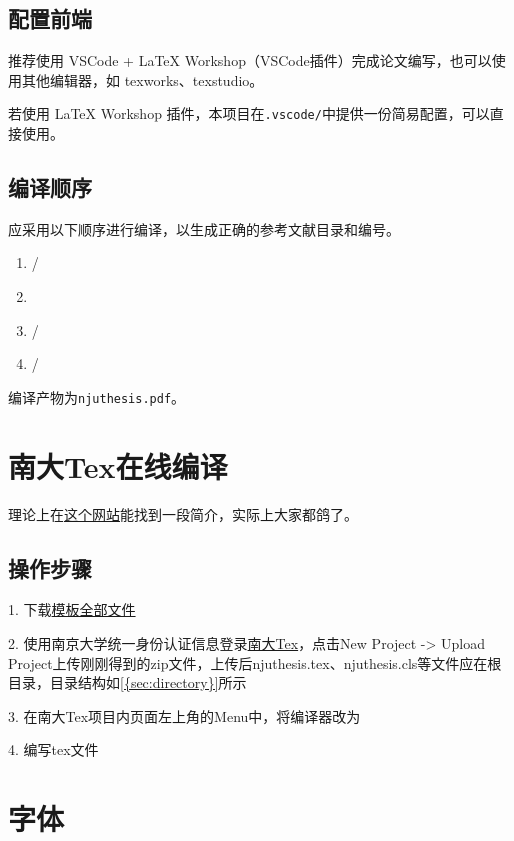 \subsection{配置前端}

推荐使用 VSCode + LaTeX Workshop（VSCode插件）完成论文编写，也可以使用其他编辑器，如 texworks、texstudio。

若使用 LaTeX Workshop 插件，本项目在\lstinline|.vscode/|中提供一份简易配置，可以直接使用。

\subsection{编译顺序}
应采用以下顺序进行编译，以生成正确的参考文献目录和编号。
\begin{enumerate}
    \item {}/
    \item {}
    \item {}/
    \item {}/
\end{enumerate}

编译产物为\lstinline|njuthesis.pdf|。

\section{南大Tex在线编译}

理论上在\href{https://doc.nju.edu.cn/books/latex}{这个网站}能找到一段简介，实际上大家都鸽了。

\subsection{操作步骤}

1. 下载\href{https://github.com/nju-lug/NJUThesisUndergraduate/archive/refs/heads/master.zip}{模板全部文件}

2. 使用南京大学统一身份认证信息登录\href{https://tex.nju.edu.cn}{南大Tex}，点击New Project -> Upload Project上传刚刚得到的zip文件，上传后njuthesis.tex、njuthesis.cls等文件应在根目录，目录结构如\cref{{sec:directory}}所示

3. 在南大Tex项目内页面左上角的Menu中，将编译器改为

4. 编写tex文件


\section{字体}

